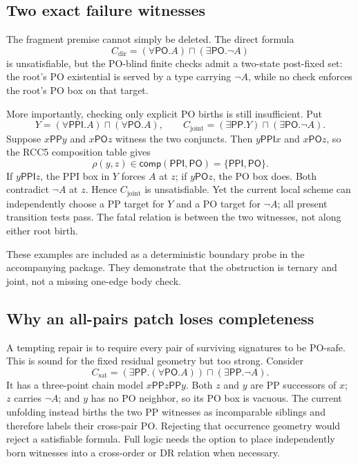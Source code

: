 \documentclass[11pt]{article}
\newcommand{\PP}{\mathsf{PP}}
\newcommand{\PPI}{\mathsf{PPI}}
\newcommand{\PO}{\mathsf{PO}}
\begin{document}
\subsection{Two exact failure witnesses}

The fragment premise cannot simply be deleted. The direct formula
\[
  C_{\mathrm{dir}}=(\forall\PO.A)\sqcap(\exists\PO.\neg A)
\]
is unsatisfiable, but the PO-blind finite checks admit a two-state post-fixed set: the
root's PO existential is served by a type carrying $\neg A$, while no check enforces
the root's PO box on that target.

More importantly, checking only explicit PO births is still insufficient. Put
\[
Y=(\forall\PPI.A)\sqcap(\forall\PO.A),\qquad
C_{\mathrm{joint}}=(\exists\PP.Y)\sqcap(\exists\PO.\neg A).
\]
Suppose $x\PP y$ and $x\PO z$ witness the two conjuncts. Then
$y\PPI x$ and $x\PO z$, so the RCC5 composition table gives
\[
  \rho(y,z)\in\mathsf{comp}(\PPI,\PO)=\{\PPI,\PO\}.
\]
If $y\PPI z$, the PPI box in $Y$ forces $A$ at $z$; if $y\PO z$, the PO box does.
Both contradict $\neg A$ at $z$. Hence $C_{\mathrm{joint}}$ is unsatisfiable. Yet the
current local scheme can independently choose a PP target for $Y$ and a PO target for
$\neg A$; all present transition tests pass. The fatal relation is between the two
witnesses, not along either root birth.

These examples are included as a deterministic boundary probe in the accompanying
package. They demonstrate that the obstruction is ternary and joint, not a missing
one-edge body check.

\subsection{Why an all-pairs patch loses completeness}

A tempting repair is to require every pair of surviving signatures to be PO-safe. This
is sound for the fixed residual geometry but too strong. Consider
\[
  C_{\mathrm{sat}}=(\exists\PP.(\forall\PO.A))\sqcap(\exists\PP.\neg A).
\]
It has a three-point chain model $x\PP z\PP y$. Both $z$ and $y$ are PP successors of
$x$; $z$ carries $\neg A$; and $y$ has no PO neighbor, so its PO box is vacuous. The
current unfolding instead births the two PP witnesses as incomparable siblings and
therefore labels their cross-pair PO. Rejecting that occurrence geometry would reject
a satisfiable formula. Full logic needs the option to place independently born
witnesses into a cross-order or DR relation when necessary.
\end{document}
